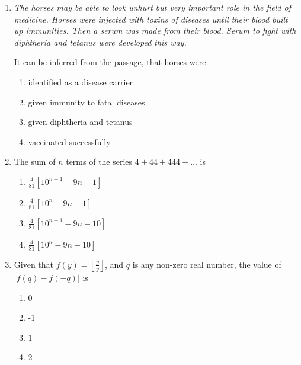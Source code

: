 \documentclass[journal,12pt,onecolumn]{IEEEtran}
\theoremstyle{remark}
\begin{document}
\begin{enumerate}
 



 

\item    \hspace{0.5cm} \textit{The horses may be able to look unhurt but very important role in the field of medicine. Horses were injected with toxins of diseases until their blood built up immunities. Then a serum was made from their blood. Serum to fight with diphtheria and tetanus were developed this way.}

It can be inferred from the passage, that horses were  \hfill{}

\begin{multicols}{2}
\begin{enumerate}
    \item identified as a disease carrier
    \item given immunity to fatal diseases
    \item given diphtheria and tetanus
    \item vaccinated successfully
\end{enumerate}
\end{multicols}
 

\item    \hspace{0.5cm} The sum of $n$ terms of the series $4+44+444+\ldots$ is  \hfill{}

\begin{multicols}{2}
\begin{enumerate}
    \item $\frac{4}{81} \left[10^{n+1} - 9n - 1 \right]$
    \item $\frac{4}{81} \left[10^{n} - 9n - 1 \right]$
    \item $\frac{4}{81} \left[10^{n+1} - 9n - 10 \right]$
    \item $\frac{4}{81} \left[10^n - 9n - 10 \right]$
\end{enumerate}
\end{multicols}

 

\item    \hspace{0.5cm} Given that $f(y) = \left\lfloor \frac{y}{y} \right\rfloor$, and $q$ is any non-zero real number, the value of $|f(q) - f(-q)|$ is  \hfill{}

\begin{multicols}{2}
\begin{enumerate}
    \item 0
    \item -1
    \item 1
    \item 2
\end{enumerate}
\end{multicols}


\end{enumerate}
\end{document}
